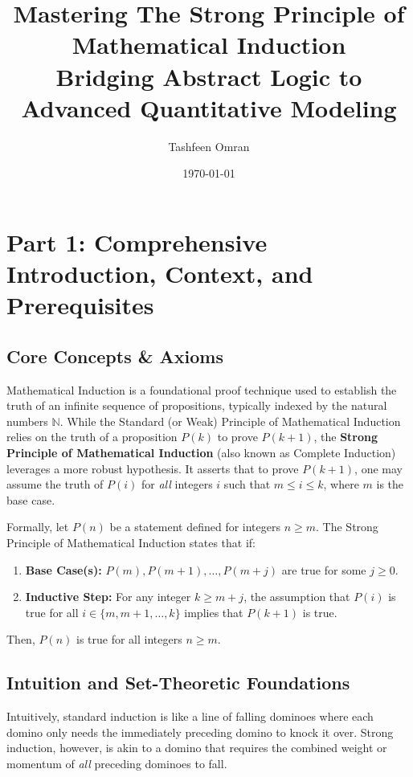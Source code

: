 \documentclass[11pt, a4paper]{article}
\theoremstyle{definition}
\theoremstyle{remark}
\newcommand{\N}{\mathbb{N}}
\begin{document}
\title{\textbf{Mastering The Strong Principle of Mathematical Induction}\\
\large Bridging Abstract Logic to Advanced Quantitative Modeling}
\author{Tashfeen Omran}
\date{\today}

\maketitle

\tableofcontents
\newpage

\section{Part 1: Comprehensive Introduction, Context, and Prerequisites}

\subsection{Core Concepts \& Axioms}
Mathematical Induction is a foundational proof technique used to establish the truth of an infinite sequence of propositions, typically indexed by the natural numbers $\N$. While the Standard (or Weak) Principle of Mathematical Induction relies on the truth of a proposition $P(k)$ to prove $P(k+1)$, the \textbf{Strong Principle of Mathematical Induction} (also known as Complete Induction) leverages a more robust hypothesis. It asserts that to prove $P(k+1)$, one may assume the truth of $P(i)$ for \textit{all} integers $i$ such that $m \le i \le k$, where $m$ is the base case.

Formally, let $P(n)$ be a statement defined for integers $n \ge m$. The Strong Principle of Mathematical Induction states that if:
\begin{enumerate}
    \item \textbf{Base Case(s):} $P(m), P(m+1), \dots, P(m+j)$ are true for some $j \ge 0$.
    \item \textbf{Inductive Step:} For any integer $k \ge m+j$, the assumption that $P(i)$ is true for all $i \in \{m, m+1, \dots, k\}$ implies that $P(k+1)$ is true.
\end{enumerate}
Then, $P(n)$ is true for all integers $n \ge m$.

\subsection{Intuition and Set-Theoretic Foundations}
Intuitively, standard induction is like a line of falling dominoes where each domino only needs the immediately preceding domino to knock it over. Strong induction, however, is akin to a domino that requires the combined weight or momentum of \textit{all} preceding dominoes to fall. 
\end{document}
